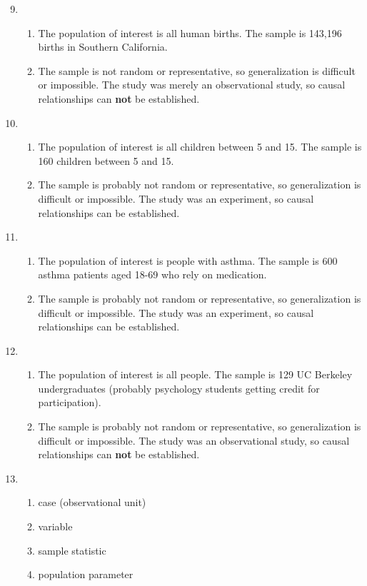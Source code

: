 \documentclass[12pt,letterpaper]{article}
\begin{document}
\begin{enumerate}
\setcounter{enumi}{8}
\item
\begin{enumerate}
\item The population of interest is all human births. The sample is 143,196 births in Southern California.
\item The sample is not random or representative, so generalization is difficult or impossible. The study was merely an observational study, so causal relationships can {\bf not} be established. 
\end{enumerate}

\item
\begin{enumerate}
\item The population of interest is all children between 5 and 15. The sample is 160 children between 5 and 15.
\item The sample is probably not random or representative, so generalization is difficult or impossible. The study was an experiment, so causal relationships can be established. 
\end{enumerate}

\item
\begin{enumerate}
\item The population of interest is people with asthma. The sample is 600 asthma patients aged 18-69 who rely on medication.
\item The sample is probably not random or representative, so generalization is difficult or impossible. The study was an experiment, so causal relationships can be established. 
\end{enumerate}

\item
\begin{enumerate}
\item The population of interest is all people. The sample is 129 UC Berkeley undergraduates (probably psychology students getting credit for participation).
\item The sample is probably not random or representative, so generalization is difficult or impossible. The study was an observational study, so causal relationships can {\bf not} be established. 
\end{enumerate}

\item
\begin{enumerate}
\item case (observational unit) %
\item variable
\item sample statistic
\item population parameter
\end{enumerate}


\end{enumerate}
\end{document}
